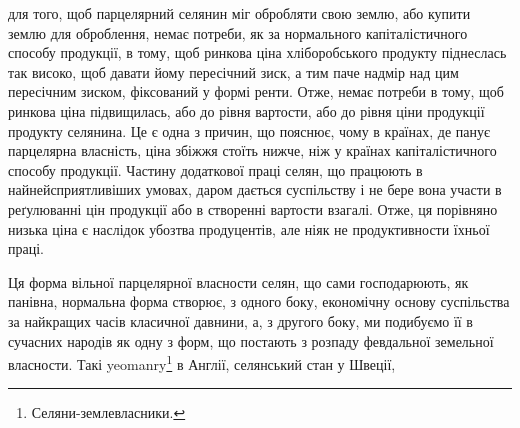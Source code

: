 для того, щоб парцелярний селянин міг обробляти свою землю, або купити
землю для оброблення, немає потреби, як за нормального капіталістичного
способу продукції, в тому, щоб ринкова ціна хліборобського продукту піднеслась
так високо, щоб давати йому пересічний зиск, а тим паче надмір над цим
пересічним зиском, фіксований у формі ренти. Отже, немає потреби в тому,
щоб ринкова ціна підвищилась, або до рівня вартости, або до рівня ціни продукції
продукту селянина. Це є одна з причин, що пояснює, чому в країнах,
де панує парцелярна власність, ціна збіжжя стоїть нижче, ніж у країнах капіталістичного
способу продукції. Частину додаткової праці селян, що працюють
в найнейсприятливіших умовах, даром дається суспільству і не бере вона участи
в реґулюванні цін продукції або в створенні вартости взагалі. Отже, ця порівняно
низька ціна є наслідок убозтва продуцентів, але ніяк не продуктивности
їхньої праці.

Ця форма вільної парцелярної власности селян, що сами господарюють, як
панівна, нормальна форма створює, з одного боку, економічну основу суспільства
за найкращих часів класичної давнини, а, з другого боку, ми подибуємо
її в сучасних народів як одну з форм, що постають з розпаду февдальної
земельної власности. Такі yeomanry\footnote*{
Селяни-землевласники. 
} в Англії, селянський стан у Швеції,
\parbreak{}  %
